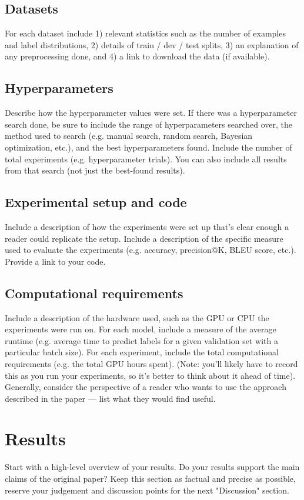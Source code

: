 \documentclass[10pt]{article} %
\begin{document}
	\subsection{Datasets}
	For each dataset include 1) relevant statistics such as the number of examples and label distributions, 2) details of train / dev / test splits, 3) an explanation of any preprocessing done, and 4) a link to download the data (if available).
	
	\subsection{Hyperparameters}
	Describe how the hyperparameter values were set. If there was a hyperparameter search done, be sure to include the range of hyperparameters searched over, the method used to search (e.g. manual search, random search, Bayesian optimization, etc.), and the best hyperparameters found. Include the number of total experiments (e.g. hyperparameter trials). You can also include all results from that search (not just the best-found results).
	
	\subsection{Experimental setup and code}
	Include a description of how the experiments were set up that's clear enough a reader could replicate the setup. 
	Include a description of the specific measure used to evaluate the experiments (e.g. accuracy, precision@K, BLEU score, etc.). 
	Provide a link to your code.
	
	\subsection{Computational requirements}
	Include a description of the hardware used, such as the GPU or CPU the experiments were run on. 
	For each model, include a measure of the average runtime (e.g. average time to predict labels for a given validation set with a particular batch size).
	For each experiment, include the total computational requirements (e.g. the total GPU hours spent).
	(Note: you'll likely have to record this as you run your experiments, so it's better to think about it ahead of time). Generally, consider the perspective of a reader who wants to use the approach described in the paper --- list what they would find useful.
	
	\section{Results}
	\label{sec:results}
	Start with a high-level overview of your results. Do your results support the main claims of the original paper? Keep this section as factual and precise as possible, reserve your judgement and discussion points for the next "Discussion" section. 
	
\end{document}
